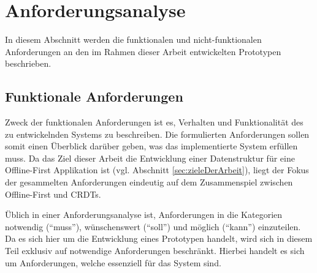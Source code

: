 \documentclass[a4paper, 12pt]{scrreprt}
\begin{document}
\section{Anforderungsanalyse}
\label{sec:anforderungsanalyse}

In diesem Abschnitt werden die funktionalen und nicht-funktionalen Anforderungen an den im Rahmen dieser Arbeit entwickelten Prototypen beschrieben.

\subsection{Funktionale Anforderungen}
\label{sec:funktionaleAnforderungen}
Zweck der funktionalen Anforderungen ist es, Verhalten und Funktionalität des zu entwickelnden Systems zu beschreiben. Die formulierten Anforderungen sollen somit einen Überblick darüber geben, was das implementierte System erfüllen muss. Da das Ziel dieser Arbeit die Entwicklung einer Datenstruktur für eine Offline-First Applikation ist (vgl. Abschnitt \ref{sec:zieleDerArbeit}), liegt der Fokus der gesammelten Anforderungen eindeutig auf dem Zusammenspiel zwischen Offline-First und \acp{CRDT}.

Üblich in einer Anforderungsanalyse ist, Anforderungen in die Kategorien notwendig (\enquote{muss}), wünschenswert (\enquote{soll}) und möglich (\enquote{kann}) einzuteilen. Da es sich hier um die Entwicklung eines Prototypen handelt, wird sich in diesem Teil exklusiv auf notwendige Anforderungen beschränkt. Hierbei handelt es sich um Anforderungen, welche essenziell für das System sind.
\end{document}
